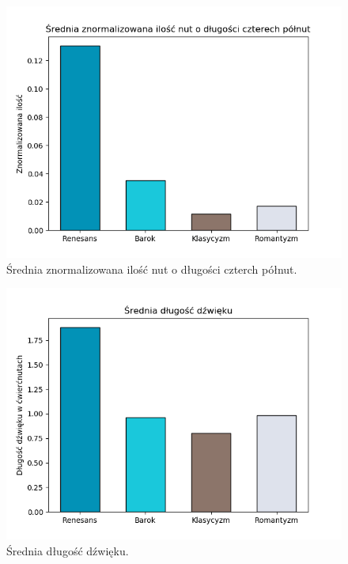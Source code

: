 \documentclass[printmode, eng, openany]{mgr}
\begin{document}
\begin{figure}[H]
\centering
\includegraphics[scale=0.75]{plots/4fullnotes.png}
\caption{Średnia znormalizowana ilość nut o długości czterch półnut.}
\end{figure}
\begin{figure}[H]
\centering
\includegraphics[scale=0.75]{plots/avg_note_dur.png}
\caption{Średnia długość dźwięku.}
\end{figure}
\end{document}
